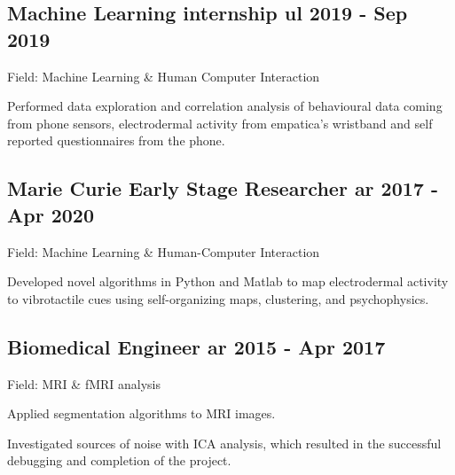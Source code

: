 \documentclass[a4paper,12pt]{article}
\begin{document}
\subsection{{Machine Learning internship \texorpdfstring{\hfill} Jul 2019 - Sep 2019}}
\vspace*{1pt}
Field: Machine Learning \& Human Computer Interaction \\
\vspace*{\spaceAfterField}
\begin{zitemize}
\item Performed data exploration and correlation analysis of behavioural data coming from phone sensors, electrodermal activity from empatica's wristband and self reported questionnaires from the phone.
\end{zitemize}
\vspace*{5pt}


\subsection{{Marie Curie Early Stage Researcher \texorpdfstring{\hfill} Mar 2017 - Apr 2020}}
\vspace*{1pt}
Field: Machine Learning \& Human-Computer Interaction
\vspace*{\spaceAfterField}
\begin{zitemize}
\item Developed novel algorithms in Python and Matlab to map electrodermal activity to vibrotactile cues using self-organizing maps, clustering, and psychophysics.
\end{zitemize}
\vspace*{5pt}



\subsection{{Biomedical Engineer \texorpdfstring{\hfill} Mar 2015 - Apr 2017}}
\vspace*{1pt}
Field: MRI \& fMRI analysis
\vspace*{\spaceAfterField}
\begin{zitemize}
\item Applied segmentation algorithms to MRI images.
\item Investigated sources of noise with ICA analysis, which resulted in the successful debugging and completion of the project.
\end{zitemize}
\end{document}
